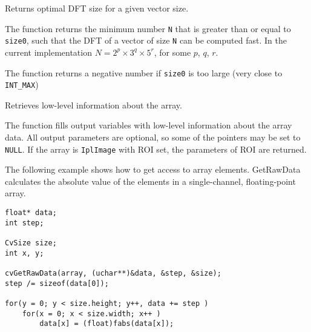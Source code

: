 \fi

Returns optimal DFT size for a given vector size.


\begin{description}
\end{description}

The function returns the minimum number
\texttt{N} that is greater than or equal to \texttt{size0}, such that the DFT
of a vector of size \texttt{N} can be computed fast. In the current
implementation $N=2^p \times 3^q \times 5^r$, for some $p$, $q$, $r$.

The function returns a negative number if \texttt{size0} is too large
(very close to \texttt{INT\_MAX})


\ifC
{}
Retrieves low-level information about the array.


\begin{description}
\end{description}

The function fills output variables with low-level information about the array data. All output parameters are optional, so some of the pointers may be set to \texttt{NULL}. If the array is \texttt{IplImage} with ROI set, the parameters of ROI are returned.

The following example shows how to get access to array elements. GetRawData calculates the absolute value of the elements in a single-channel, floating-point array.

\begin{lstlisting}
float* data;
int step;

CvSize size;
int x, y;

cvGetRawData(array, (uchar**)&data, &step, &size);
step /= sizeof(data[0]);

for(y = 0; y < size.height; y++, data += step )
    for(x = 0; x < size.width; x++ )
        data[x] = (float)fabs(data[x]);

\end{lstlisting}

